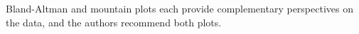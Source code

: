 

Bland-Altman and mountain plots each provide complementary perspectives on the data, and the authors recommend both plots.

